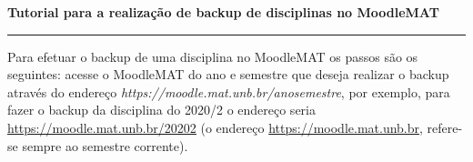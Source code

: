 \documentclass[12pt]{report}
\begin{document}
\begin{center}
{\Large \textbf{Tutorial para a realiza\c{c}\~ao de backup de disciplinas no MoodleMAT}}
\end{center}
\vspace{.3cm}
\hrule

\vspace{.7cm}

Para efetuar o backup de uma disciplina no MoodleMAT os passos s\~ao os seguintes: acesse o MoodleMAT do ano e semestre que deseja realizar o backup atrav\'es do endere\c{c}o \textit{https://moodle.mat.unb.br/anosemestre}, por exemplo, para fazer o backup da disciplina do 2020/2 o endere\c{c}o seria \href{https://moodle.mat.unb.br/20202}{https://moodle.mat.unb.br/20202} (o endere\c{c}o \href{https://moodle.mat.unb.br}{https://moodle.mat.unb.br}, refere-se sempre ao semestre corrente).
\end{document}
